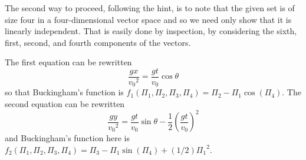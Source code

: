 \begin{ans}{1}
\begin{exparts}
          The second way to proceed, following the hint, is to note that
          the given set is of size four in a four-dimensional vector space
          and so we need only show that it is linearly independent.
          That is easily done by inspection, by considering the
          sixth, first, second, and fourth components of the vectors.
        \item The first equation can be rewritten
          \begin{equation*}
            \frac{gx}{{v_0}^2}=\frac{gt}{v_0}\cos\theta
          \end{equation*}
          so that Buckingham's function is
          $f_1(\Pi_1,\Pi_2,\Pi_3,\Pi_4)=\Pi_2-\Pi_1\cos(\Pi_4)$.
          The second equation can be rewritten
          \begin{equation*}
            \frac{gy}{{v_0}^2}=\frac{gt}{v_0}\sin\theta
              -\frac{1}{2}\left(\frac{gt}{v_0}\right)^2
          \end{equation*}
          and Buckingham's function here is
          $f_2(\Pi_1,\Pi_2,\Pi_3,\Pi_4)
             =\Pi_3-\Pi_1\sin(\Pi_4)+(1/2){\Pi_1}^2$.
      \end{exparts}
    
\end{ans}
